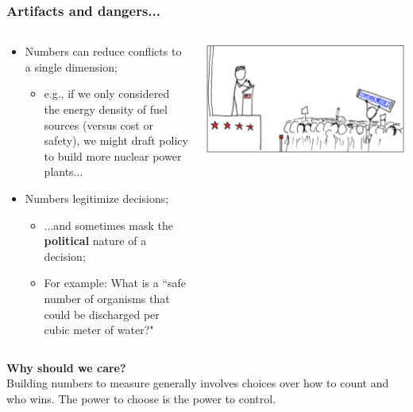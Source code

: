 \documentclass[aspectratio=169]{beamer}
\theoremstyle{principle}
\begin{document}
\begin{frame}
\frametitle{Artifacts and dangers...}
\begin{columns}
\begin{column}{0.5\textwidth}

\begin{itemize}
\item Numbers can reduce conflicts to a single dimension;
\begin{itemize}
\item e.g., if we only considered the energy density of fuel sources (versus cost or safety), we might draft policy to build more nuclear power plants...
\end{itemize} 
\bigskip

\item Numbers legitimize decisions;
\begin{itemize}
\item ...and sometimes mask the \textbf{political} nature of a decision;
\item For example: What is a ``safe number of organisms that could be discharged per cubic meter of water?"
\end{itemize}
\end{itemize}

\end{column}
\begin{column}{0.5\textwidth}
\includegraphics[scale=0.4]{speech.png}
\end{column}
\end{columns}

\end{frame}

\begin{frame}

\begin{center}
\Huge\textbf{Why should we care?}\\
\bigskip
\bigskip
\large Building numbers to measure generally involves choices over how to count and who wins.  The power to choose is the power to control.\\
\end{center}

\end{frame}

\end{document}
